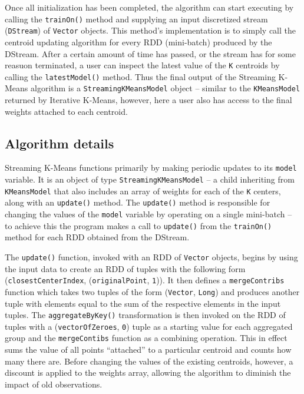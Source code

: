 \documentclass{l4proj}
\begin{document}
Once all initialization has been completed, the algorithm can start executing by calling the \texttt{trainOn()} method and supplying an input discretized stream (\texttt{DStream}) of \texttt{Vector} objects. This method's implementation is to simply call the centroid updating algorithm for every RDD (mini-batch) produced by the DStream. After a certain amount of time has passed, or the stream has for some reasuon terminated, a user can inspect the latest value of the \texttt{K} centroids by calling the \texttt{latestModel()} method. Thus the final output of the Streaming K-Means algorithm is a \texttt{StreamingKMeansModel} object -- similar to the \texttt{KMeansModel} returned by Iterative K-Means, however, here a user also has access to the final weights attached to each centroid.

\subsection{Algorithm details}

Streaming K-Means functions primarily by making periodic updates to its \texttt{model} variable. It is an object of type \texttt{StreamingKMeansModel} -- a child inheriting from \texttt{KMeansModel} that also includes an array of weights for each of the \texttt{K} centers, along with an \texttt{update()} method. The \texttt{update()} method is responsible for changing the values of the \texttt{model} variable by operating on a single mini-batch -- to achieve this the program makes a call to \texttt{update()} from the \texttt{trainOn()} method for each RDD obtained from the DStream.

The \texttt{update()} function, invoked with an RDD of \texttt{Vector} objects, begins by using the input data to create an RDD of tuples with the following form (\texttt{closestCenterIndex}, (\texttt{originalPoint}, \texttt{1})). It then defines a \texttt{mergeContribs} function which takes two tuples of the form (\texttt{Vector}, \texttt{Long}) and produces another tuple with elements equal to the sum of the respective elements in the input tuples. The \texttt{aggregateByKey()} transformation is then invoked on the RDD of tuples with a (\texttt{vectorOfZeroes}, \texttt{0}) tuple as a starting value for each aggregated group and the \texttt{mergeContibs} function as a combining operation. This in effect sums the value of all points ``attached'' to a particular centroid and counts how many there are. Before changing the values of the existing centroids, however, a discount is applied to the weights array, allowing the algorithm to diminish the impact of old observations.\\ \\
\end{document}
